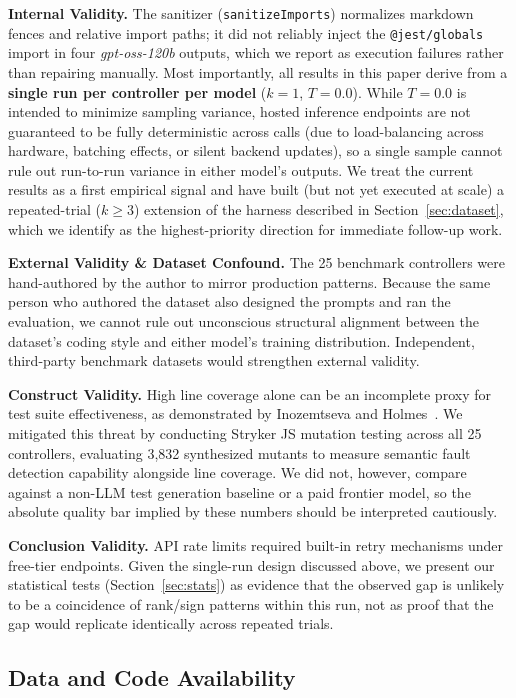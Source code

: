 \documentclass[conference]{IEEEtran}
\begin{document}
\textbf{Internal Validity.} The sanitizer (\texttt{sanitizeImports}) normalizes markdown fences and relative import paths; it did not reliably inject the \texttt{@jest/globals} import in four \textit{gpt-oss-120b} outputs, which we report as execution failures rather than repairing manually. Most importantly, all results in this paper derive from a \textbf{single run per controller per model} ($k=1$, $T=0.0$). While $T=0.0$ is intended to minimize sampling variance, hosted inference endpoints are not guaranteed to be fully deterministic across calls (due to load-balancing across hardware, batching effects, or silent backend updates), so a single sample cannot rule out run-to-run variance in either model's outputs. We treat the current results as a first empirical signal and have built (but not yet executed at scale) a repeated-trial ($k \geq 3$) extension of the harness described in Section~\ref{sec:dataset}, which we identify as the highest-priority direction for immediate follow-up work.

\textbf{External Validity \& Dataset Confound.} The 25 benchmark controllers were hand-authored by the author to mirror production patterns. Because the same person who authored the dataset also designed the prompts and ran the evaluation, we cannot rule out unconscious structural alignment between the dataset's coding style and either model's training distribution. Independent, third-party benchmark datasets would strengthen external validity.

\textbf{Construct Validity.} High line coverage alone can be an incomplete proxy for test suite effectiveness, as demonstrated by Inozemtseva and Holmes~\cite{inozemtseva2014coverage}. We mitigated this threat by conducting Stryker JS mutation testing across all 25 controllers, evaluating 3,832 synthesized mutants to measure semantic fault detection capability alongside line coverage. We did not, however, compare against a non-LLM test generation baseline or a paid frontier model, so the absolute quality bar implied by these numbers should be interpreted cautiously.

\textbf{Conclusion Validity.} API rate limits required built-in retry mechanisms under free-tier endpoints. Given the single-run design discussed above, we present our statistical tests (Section~\ref{sec:stats}) as evidence that the observed gap is unlikely to be a coincidence of rank/sign patterns within this run, not as proof that the gap would replicate identically across repeated trials.

\subsection{Data and Code Availability}
\end{document}
